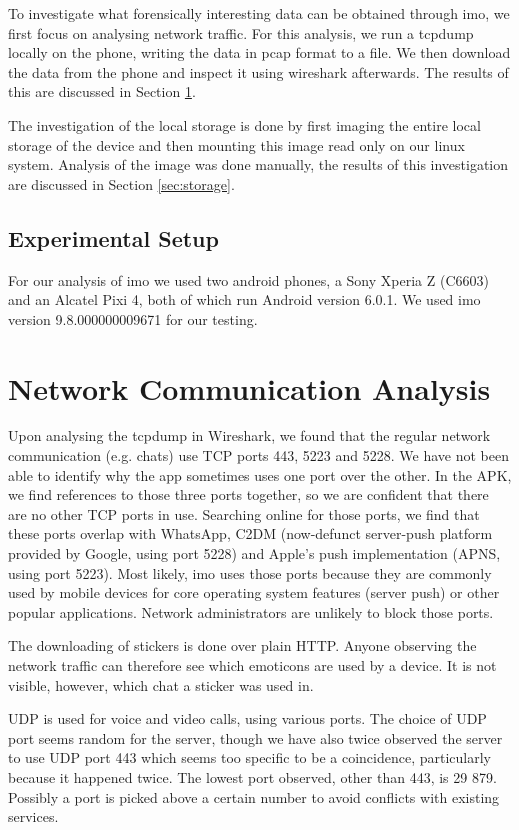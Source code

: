\documentclass[conference]{IEEEtran}
\begin{document}
To investigate what forensically interesting data can be obtained through imo,
we first focus on analysing network traffic. For this analysis, we run a tcpdump
locally on the phone, writing the data in pcap format to a file. We then download
the data from the phone and inspect it using wireshark afterwards. The
results of this are discussed in Section \ref{sec:network}.

The investigation of the local storage is done by first imaging the entire local
storage of the device and then mounting this image read only on our linux
system. Analysis of the image was done manually, the results of this
investigation are discussed in Section \ref{sec:storage}.


\subsection{Experimental Setup}

For our analysis of imo we used two android phones, a Sony Xperia Z (C6603) and
an Alcatel Pixi 4, both of which run Android version 6.0.1. We used imo
version 9.8.000000009671 for our testing.

\section{Network Communication Analysis}\label{sec:network}

Upon analysing the tcpdump in Wireshark, we found that the regular network
communication (e.g. chats) use TCP ports 443, 5223 and 5228. We have not been
able to identify why the app sometimes uses one port over the other. In the APK,
we find references to those three ports together, so we are confident that there
are no other TCP ports in use.  Searching online for those ports, we find that
these ports overlap with WhatsApp, C2DM (now-defunct server-push platform
provided by Google, using port 5228) and Apple's push implementation (APNS,
using port 5223). Most likely, imo uses those ports because they are commonly
used by mobile devices for core operating system features (server push) or other
popular applications. Network administrators are unlikely to block those ports.

The downloading of stickers is done over plain HTTP. Anyone observing the
network traffic can therefore see which emoticons are used by a device. It is
not visible, however, which chat a sticker was used in.

UDP is used for voice and video calls, using various ports. The choice of UDP
port seems random for the server, though we have also twice observed the server
to use UDP port 443 which seems too specific to be a coincidence, particularly
because it happened twice. The lowest port observed, other than 443, is 29 879.
Possibly a port is picked above a certain number to avoid conflicts with
existing services.
\end{document}
